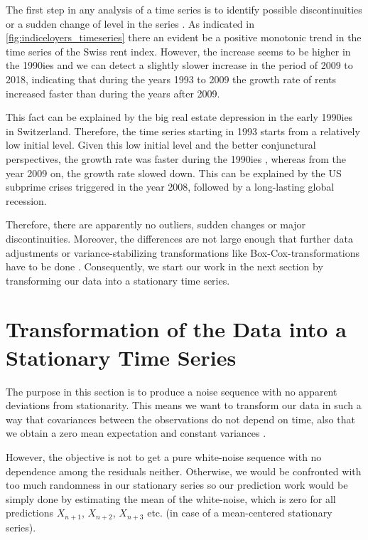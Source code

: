 \documentclass[11pt,a4paper]{article}
\begin{document}
The first step in any analysis of a time series is to identify possible discontinuities or a sudden change of level in the series \cite[p.~23]{bd02}.
As indicated in \cref{fig:indiceloyers_timeseries} there an evident be a positive monotonic trend in the time series of the Swiss rent index.
However, the increase seems to be higher in the 1990ies and we can detect a slightly slower increase in the period of 2009 to 2018, indicating that during the years 1993 to 2009 the growth rate of rents increased faster than during the years after 2009.

This fact can be explained by the big real estate depression in the early 1990ies in Switzerland.
Therefore, the time series starting in 1993 starts from a relatively low initial level.
Given this low initial level and the better conjunctural perspectives, the growth rate was faster during the 1990ies \citep{fuw}, whereas from the year 2009 on, the growth rate slowed down.
This can be explained by the US subprime crises triggered in the year 2008, followed by a long-lasting global recession.

Therefore, there are apparently no outliers, sudden changes or major discontinuities.
Moreover, the differences are not large enough that further data adjustments or variance-stabilizing transformations like Box-Cox-transformations have to be done \citep{boxcox64}.
Consequently, we start our work in the next section by transforming our data into a stationary time series.



\section{Transformation of the Data into a Stationary Time Series}

The purpose in this section is to produce a noise sequence with no apparent deviations from stationarity.
This means we want to transform our data in such a way that covariances between the observations do not depend on time, also that we obtain a zero mean expectation and constant variances \cite[pp.~14--23]{bd02}.

However, the objective is not to get a pure white-noise sequence with no dependence among the residuals neither.
Otherwise, we would be confronted with too much randomness in our stationary series so our prediction work would be simply done by estimating the mean of the white-noise, which is zero for all predictions $X_{n+1}$, $X_{n+2}$, $X_{n+3}$ etc. (in case of a mean-centered stationary series).
\end{document}
